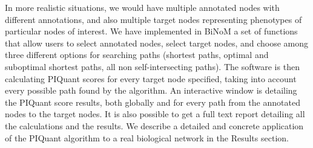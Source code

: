 \documentclass[10pt]{bmc_article}
\newenvironment{bmcformat}{\baselineskip20pt\sloppy\setboolean{publ}{false}}{\baselineskip20pt\sloppy}
\begin{document}
\begin{bmcformat}
%
%
%
%
%

In more realistic situations, we would have multiple annotated nodes with different
 annotations, and also multiple target nodes representing phenotypes of
particular nodes of interest. We have implemented in BiNoM a set of functions
that allow users to select annotated nodes, select target nodes, and choose among
three different options for searching paths (shortest paths, optimal and
suboptimal shortest paths, all non self-intersecting paths). The software is then
calculating PIQuant scores for every target node specified, taking into account
every possible path found by the algorithm. An interactive window is detailing
the PIQuant score results, both globally and for every path from the annotated
nodes to the target nodes. It is also possible to get a full text report
detailing all the calculations and the results. We describe a detailed
and concrete application of the PIQuant algorithm to a real biological network
in the Results section.


\end{bmcformat}
\end{document}
